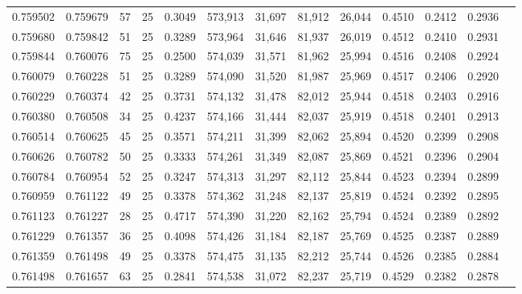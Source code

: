 \begin{tabular}{rrrrrrrrrrrrr}
0.759502 & 0.759679 &    57 &  25 &                                     0.3049 & 573,913 &  31,697 &  81,912 &  26,044 & 0.4510 & 0.2412 & 0.2936 \\
0.759680 & 0.759842 &    51 &  25 &                                     0.3289 & 573,964 &  31,646 &  81,937 &  26,019 & 0.4512 & 0.2410 & 0.2931 \\
0.759844 & 0.760076 &    75 &  25 &                                     0.2500 & 574,039 &  31,571 &  81,962 &  25,994 & 0.4516 & 0.2408 & 0.2924 \\
0.760079 & 0.760228 &    51 &  25 &                                     0.3289 & 574,090 &  31,520 &  81,987 &  25,969 & 0.4517 & 0.2406 & 0.2920 \\
0.760229 & 0.760374 &    42 &  25 &                                     0.3731 & 574,132 &  31,478 &  82,012 &  25,944 & 0.4518 & 0.2403 & 0.2916 \\
0.760380 & 0.760508 &    34 &  25 &                                     0.4237 & 574,166 &  31,444 &  82,037 &  25,919 & 0.4518 & 0.2401 & 0.2913 \\
0.760514 & 0.760625 &    45 &  25 &                                     0.3571 & 574,211 &  31,399 &  82,062 &  25,894 & 0.4520 & 0.2399 & 0.2908 \\
0.760626 & 0.760782 &    50 &  25 &                                     0.3333 & 574,261 &  31,349 &  82,087 &  25,869 & 0.4521 & 0.2396 & 0.2904 \\
0.760784 & 0.760954 &    52 &  25 &                                     0.3247 & 574,313 &  31,297 &  82,112 &  25,844 & 0.4523 & 0.2394 & 0.2899 \\
0.760959 & 0.761122 &    49 &  25 &                                     0.3378 & 574,362 &  31,248 &  82,137 &  25,819 & 0.4524 & 0.2392 & 0.2895 \\
0.761123 & 0.761227 &    28 &  25 &                                     0.4717 & 574,390 &  31,220 &  82,162 &  25,794 & 0.4524 & 0.2389 & 0.2892 \\
0.761229 & 0.761357 &    36 &  25 &                                     0.4098 & 574,426 &  31,184 &  82,187 &  25,769 & 0.4525 & 0.2387 & 0.2889 \\
0.761359 & 0.761498 &    49 &  25 &                                     0.3378 & 574,475 &  31,135 &  82,212 &  25,744 & 0.4526 & 0.2385 & 0.2884 \\
0.761498 & 0.761657 &    63 &  25 &                                     0.2841 & 574,538 &  31,072 &  82,237 &  25,719 & 0.4529 & 0.2382 & 0.2878 \\

\end{tabular}
